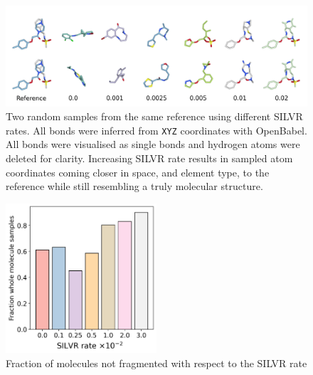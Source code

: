\documentclass[journal=jacsat,manuscript=article]{achemso}
\begin{document}
\begin{suppinfo}
\begin{figure}[hb!]
    \centering
    \includegraphics[width=\textwidth]{paper/Figures/FigS2/fig_2_sample_vs_rate.png}
    \caption{Two random samples from the same reference using different SILVR rates. All bonds were inferred from \texttt{XYZ} coordinates with OpenBabel. All bonds were visualised as single bonds and hydrogen atoms were deleted for clarity. Increasing SILVR rate results in sampled atom coordinates coming closer in space, and element type, to the reference while still resembling a truly molecular structure.}
    \label{fig:examples_curated}
\end{figure}

\begin{figure}
    \centering
    \includegraphics[width=0.5\textwidth]{paper/Figures/FigS3/fraction_whole_samples.png}
    \caption{Fraction of molecules not fragmented with respect to the SILVR rate}
    \label{fig:fragmentation}
\end{figure}


\end{suppinfo}
\end{document}

